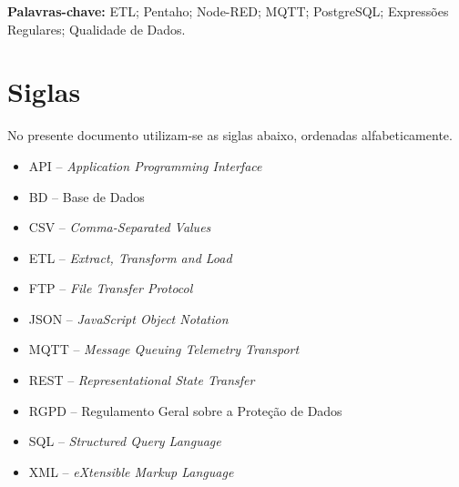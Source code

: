 \documentclass[11pt,a4paper]{article}
\begin{document}
\clearpage

\begin{abstract}
O presente relatório documenta o desenvolvimento de um processo de \textit{Extract, Transform and Load} (ETL) para a loja fictícia ISI Store. O problema consistiu na dispersão de dados por sistemas isolados: vendas em CSV, clientes em JSON, catálogo em XML, \textit{stock} em base de dados relacional PostgreSQL e catálogo externo via API REST. No estado da arte compararam-se as plataformas Pentaho Data Integration, Talend Open Studio e KNIME, tendo-se selecionado o Pentaho pela orquestração visual de transformações e \textit{jobs}. A abordagem seguiu uma metodologia de \textit{Design Science Research}, com especificação de requisitos, conceção da arquitetura, implementação incremental e avaliação por contagens e \textit{previews}. Implementou-se extração multiformato, limpeza com expressões regulares, anonimização, junções e agregações, carga para \textit{Data Mart}, exportações CSV/JSON, notificações por correio eletrónico, transferência FTP e um painel complementar em Node-RED com MQTT. Obteve-se uma execução integral válida: 13 vendas reduziram-se a 10 limpas, 6 clientes a 2 válidos, 158 produtos integrados, 10 linhas carregadas em \texttt{dw\_vendas} e agregação por cidade (Braga 2077.47/3, Porto 949.98/2 e sem cliente 436.17/5). A contribuição principal é um processo reprodutível que combina integração \textit{batch}, qualidade de dados, anonimização e visualização quase em tempo real, cumprindo as três fases obrigatórias do enunciado.
\end{abstract}

\noindent\textbf{Palavras-chave:} ETL; Pentaho; Node-RED; MQTT; PostgreSQL; Expressões Regulares; Qualidade de Dados.

\section*{Siglas}
No presente documento utilizam-se as siglas abaixo, ordenadas alfabeticamente.
\begin{itemize}
\item API -- \textit{Application Programming Interface}
\item BD -- Base de Dados
\item CSV -- \textit{Comma-Separated Values}
\item ETL -- \textit{Extract, Transform and Load}
\item FTP -- \textit{File Transfer Protocol}
\item JSON -- \textit{JavaScript Object Notation}
\item MQTT -- \textit{Message Queuing Telemetry Transport}
\item REST -- \textit{Representational State Transfer}
\item RGPD -- Regulamento Geral sobre a Proteção de Dados
\item SQL -- \textit{Structured Query Language}
\item XML -- \textit{eXtensible Markup Language}
\end{itemize}
\end{document}
